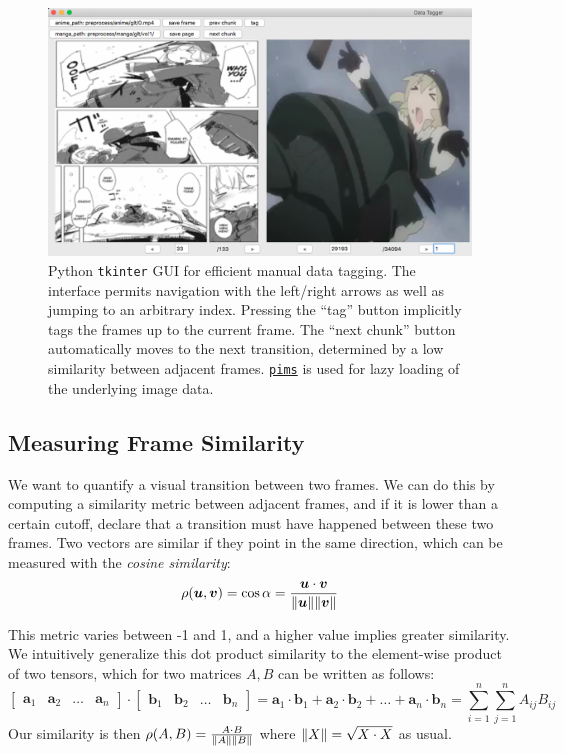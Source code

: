 \documentclass[11pt, oneside]{article}
\begin{document}
\begin{figure}[h!]
  \centering
  \includegraphics[scale=0.39]{data_tagger}
  \caption{Python \texttt{tkinter} GUI for efficient manual data
    tagging. The interface permits navigation with the left/right
    arrows as well as jumping to an arbitrary index. Pressing the
    \enquote{tag} button implicitly tags the frames up to the current
    frame. The \enquote{next chunk} button automatically moves to the
    next transition, determined by a low similarity between adjacent
    frames. \href{https://soft-matter.github.io/pims/v0.5/}{\texttt{pims}}
    is used for lazy loading of the underlying image data.}
  \label{fig:tag}
\end{figure}

\subsection{Measuring Frame Similarity}
We want to quantify a visual transition between two frames. We can do this by
computing a similarity metric between adjacent frames, and if it is lower than
a certain cutoff, declare that a transition must have happened between these
two frames. Two vectors are similar if they point in the same direction, which
can be measured with the \textit{cosine similarity}:
\[ \rho(\bm{u}, \bm{v}) = \cos{\alpha} = 
   \frac{\bm{u} \cdot \bm{v}}{\norm{\bm{u}} \norm{\bm{v}}} \]

This metric varies between -1 and 1, and a higher value implies greater
similarity. We intuitively generalize this dot product similarity to the
element-wise product of two tensors, which for two matrices \( A, B \)
can be written as follows:
\[ \begin{bmatrix} \bm{a}_1 & \bm{a}_2 & \dots & \bm{a}_n \end{bmatrix} \cdot
   \begin{bmatrix} \bm{b}_1 & \bm{b}_2 & \dots & \bm{b}_n \end{bmatrix}
   = \bm{a}_1 \cdot \bm{b}_1 + \bm{a}_2 \cdot \bm{b}_2 + \dots + \bm{a}_n \cdot \bm{b}_n
   = \sum^n_{i = 1} \sum^n_{j = 1} A_{ij} B_{ij} 
\]
Our similarity is then \( \rho(A, B) = \frac{A \cdot B}{\norm{A} \norm{B}} \)
where \( \norm{X} = \sqrt{X \cdot X} \) as usual.
\end{document}
